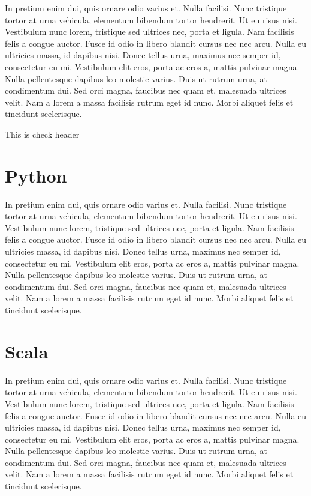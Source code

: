 \documentclass[12pt]{report}
\begin{document}
    In pretium enim dui, quis ornare odio varius et. Nulla facilisi. Nunc tristique tortor
	at urna vehicula, elementum bibendum tortor hendrerit. Ut eu risus nisi. Vestibulum nunc
	lorem, tristique sed ultrices nec, porta et ligula. Nam facilisis felis a congue auctor.
	Fusce id odio in libero blandit cursus nec nec arcu. Nulla eu ultricies massa, id dapibus nisi. Donec tellus urna, maximus nec semper id, consectetur eu mi. Vestibulum elit eros, porta ac eros a, mattis pulvinar magna. Nulla pellentesque dapibus leo molestie varius. Duis ut rutrum urna, at condimentum dui. Sed orci magna, faucibus nec quam et, malesuada ultrices velit. Nam a lorem a massa facilisis rutrum eget id nunc. Morbi aliquet felis et tincidunt scelerisque.


    This is check header
    \section{Python}
	In pretium enim dui, quis ornare odio varius et. Nulla facilisi. Nunc tristique tortor at urna vehicula, elementum bibendum tortor hendrerit. Ut eu risus nisi. Vestibulum nunc lorem, tristique sed ultrices nec, porta et ligula. Nam facilisis felis a congue auctor. Fusce id odio in libero blandit cursus nec nec arcu. Nulla eu ultricies massa, id dapibus nisi. Donec tellus urna, maximus nec semper id, consectetur eu mi. Vestibulum elit eros, porta ac eros a, mattis pulvinar magna. Nulla pellentesque dapibus leo molestie varius. Duis ut rutrum urna, at condimentum dui. Sed orci magna, faucibus nec quam et, malesuada ultrices velit. Nam a lorem a massa facilisis rutrum eget id nunc. Morbi aliquet felis et tincidunt scelerisque.

    \section{Scala}
	In pretium enim dui, quis ornare odio varius et. Nulla facilisi. Nunc tristique tortor at urna vehicula, elementum bibendum tortor hendrerit. Ut eu risus nisi. Vestibulum nunc lorem, tristique sed ultrices nec, porta et ligula. Nam facilisis felis a congue auctor. Fusce id odio in libero blandit cursus nec nec arcu. Nulla eu ultricies massa, id dapibus nisi. Donec tellus urna, maximus nec semper id, consectetur eu mi. Vestibulum elit eros, porta ac eros a, mattis pulvinar magna. Nulla pellentesque dapibus leo molestie varius. Duis ut rutrum urna, at condimentum dui. Sed orci magna, faucibus nec quam et, malesuada ultrices velit. Nam a lorem a massa facilisis rutrum eget id nunc. Morbi aliquet felis et tincidunt scelerisque.


\end{document}
